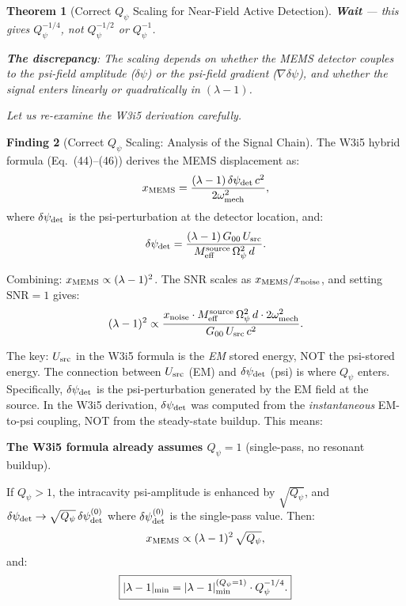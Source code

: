 \documentclass[11pt]{article}
\newcommand{\dpsi}{\delta\psi}
\newcommand{\lam}{\lambda}
\newcommand{\Opsi}{\Omega_\psi}
\newcommand{\Meff}{M_{\rm eff}}
\newcommand{\Qpsi}{Q_\psi}
\newcommand{\SNR}{\mathrm{SNR}}
\newcommand{\lbone}{|\lam - 1|}
\newtheorem{theorem}{Theorem}[section]
\theoremstyle{definition}
\newtheorem{finding}[theorem]{Finding}
\theoremstyle{remark}
\begin{document}
\begin{theorem}[Correct $\Qpsi$ Scaling for Near-Field Active Detection]
\textbf{Wait} --- this gives $\Qpsi^{-1/4}$, not $\Qpsi^{-1/2}$ or
$\Qpsi^{-1}$.

\textbf{The discrepancy}: The scaling depends on whether the MEMS
detector couples to the psi-field \emph{amplitude} ($\dpsi$) or
the psi-field \emph{gradient} ($\nabla\dpsi$), and whether the
signal enters linearly or quadratically in $(\lam-1)$.

Let us re-examine the W3i5 derivation carefully.
\end{theorem}

\begin{finding}[Correct $\Qpsi$ Scaling: Analysis of the Signal Chain]
\label{find:correct_scaling}
The W3i5 hybrid formula (Eq.~(44)--(46)) derives the MEMS displacement
as:
\begin{equation}
x_{\rm MEMS} = \frac{(\lam-1)\,\dpsi_{\rm det}\,c^2}
{2\omega_{\rm mech}^2},
\end{equation}
where $\dpsi_{\rm det}$ is the psi-perturbation at the detector location,
and:
\begin{equation}
\dpsi_{\rm det} = \frac{(\lam-1)\,G_{00}\,U_{\rm src}}
{\Meff^{\rm source}\,\Opsi^2\,d}.
\end{equation}

Combining: $x_{\rm MEMS} \propto (\lam-1)^2$. The SNR scales as
$x_{\rm MEMS}/x_{\rm noise}$, and setting $\SNR = 1$ gives:
\begin{equation}
(\lam-1)^2 \propto \frac{x_{\rm noise}\cdot\Meff^{\rm source}\,\Opsi^2\,d
\cdot 2\omega_{\rm mech}^2}{G_{00}\,U_{\rm src}\,c^2}.
\end{equation}

The key: $U_{\rm src}$ in the W3i5 formula is the \emph{EM} stored energy,
NOT the psi-stored energy. The connection between $U_{\rm src}$ (EM) and
$\dpsi_{\rm det}$ (psi) is where $\Qpsi$ enters. Specifically,
$\dpsi_{\rm det}$ is the psi-perturbation generated by the EM field
at the source. In the W3i5 derivation, $\dpsi_{\rm det}$ was computed
from the \emph{instantaneous} EM-to-psi coupling, NOT from the
steady-state buildup. This means:

\textbf{The W3i5 formula already assumes $\Qpsi = 1$} (single-pass,
no resonant buildup).

If $\Qpsi > 1$, the intracavity psi-amplitude is enhanced by
$\sqrt{\Qpsi}$, and $\dpsi_{\rm det} \to \sqrt{\Qpsi}\,\dpsi_{\rm det}^{(0)}$
where $\dpsi_{\rm det}^{(0)}$ is the single-pass value. Then:
\begin{equation}
x_{\rm MEMS} \propto (\lam-1)^2\,\sqrt{\Qpsi},
\end{equation}
and:
\begin{equation}
\boxed{
\lbone_{\rm min} = \lbone_{\rm min}^{(\Qpsi=1)}\cdot\Qpsi^{-1/4}.
}
\label{eq:final_scaling}
\end{equation}


\end{finding}
\end{document}
